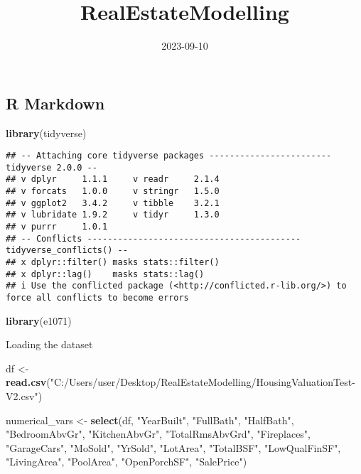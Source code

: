 \documentclass[
]{article}
\title{RealEstateModelling}
\author{}
\date{\vspace{-2.5em}2023-09-10}
\newenvironment{Shaded}{\begin{snugshade}}{\end{snugshade}}
\newcommand{\FunctionTok}[1]{\textcolor[rgb]{0.13,0.29,0.53}{\textbf{#1}}}
\newcommand{\NormalTok}[1]{#1}
\newcommand{\OtherTok}[1]{\textcolor[rgb]{0.56,0.35,0.01}{#1}}
\newcommand{\StringTok}[1]{\textcolor[rgb]{0.31,0.60,0.02}{#1}}
\begin{document}
\maketitle

\hypertarget{r-markdown}{%
\subsection{R Markdown}\label{r-markdown}}

\begin{Shaded}
\begin{Highlighting}[]
\FunctionTok{library}\NormalTok{(tidyverse)}
\end{Highlighting}
\end{Shaded}

\begin{verbatim}
## -- Attaching core tidyverse packages ------------------------ tidyverse 2.0.0 --
## v dplyr     1.1.1     v readr     2.1.4
## v forcats   1.0.0     v stringr   1.5.0
## v ggplot2   3.4.2     v tibble    3.2.1
## v lubridate 1.9.2     v tidyr     1.3.0
## v purrr     1.0.1     
## -- Conflicts ------------------------------------------ tidyverse_conflicts() --
## x dplyr::filter() masks stats::filter()
## x dplyr::lag()    masks stats::lag()
## i Use the conflicted package (<http://conflicted.r-lib.org/>) to force all conflicts to become errors
\end{verbatim}

\begin{Shaded}
\begin{Highlighting}[]
\FunctionTok{library}\NormalTok{(e1071)}
\end{Highlighting}
\end{Shaded}

Loading the dataset

\begin{Shaded}
\begin{Highlighting}[]
\NormalTok{df }\OtherTok{\textless{}{-}} \FunctionTok{read.csv}\NormalTok{(}\StringTok{"C:/Users/user/Desktop/RealEstateModelling/HousingValuationTest{-}V2.csv"}\NormalTok{)}
\end{Highlighting}
\end{Shaded}

\begin{Shaded}
\begin{Highlighting}[]
\NormalTok{numerical\_vars }\OtherTok{\textless{}{-}} \FunctionTok{select}\NormalTok{(df, }\StringTok{"YearBuilt"}\NormalTok{, }\StringTok{"FullBath"}\NormalTok{, }\StringTok{"HalfBath"}\NormalTok{, }\StringTok{"BedroomAbvGr"}\NormalTok{, }\StringTok{"KitchenAbvGr"}\NormalTok{, }\StringTok{"TotalRmsAbvGrd"}\NormalTok{, }\StringTok{"Fireplaces"}\NormalTok{, }\StringTok{"GarageCars"}\NormalTok{, }\StringTok{"MoSold"}\NormalTok{, }\StringTok{"YrSold"}\NormalTok{, }\StringTok{"LotArea"}\NormalTok{, }\StringTok{"TotalBSF"}\NormalTok{, }\StringTok{"LowQualFinSF"}\NormalTok{, }\StringTok{"LivingArea"}\NormalTok{, }\StringTok{"PoolArea"}\NormalTok{, }\StringTok{"OpenPorchSF"}\NormalTok{, }\StringTok{"SalePrice"}\NormalTok{)}
\end{Highlighting}
\end{Shaded}
\end{document}
